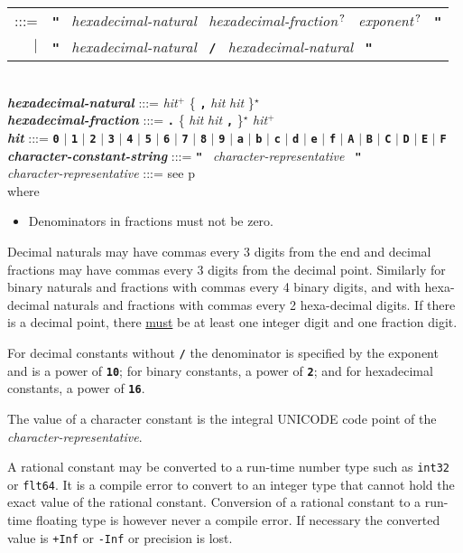 \documentclass[12pt]{article}
\newcommand{\TT}[1]{{\tt \bfseries #1}}
\newcommand{\STAR}{{\Large $^\star$}}
\newcommand{\PLUS}[1][]{{$^{+#1}$}}
\newcommand{\QMARK}{{$^{\,\mbox{\footnotesize ?}}$}}
\newcommand{\emkey}[1]{{\em \bfseries #1}}
\newcommand{\pagref}[1]{p\pageref{#1}}
\newenvironment{indpar}[1][0.3in]%
	{\begin{list}{}%
		     {\setlength{\itemsep}{0in}%
		      \setlength{\topsep}{0in}%
		      \setlength{\parsep}{1ex}%
		      \setlength{\labelwidth}{#1}%
		      \setlength{\leftmargin}{#1}%
		      \addtolength{\leftmargin}{\labelsep}}%
	 \item}%
	{\end{list}}
\begin{document}
\begin{indpar}
\begin{tabular}[t]{@{}rl}
    :::= & \TT{"}~ {\em hexadecimal-natural}~
                   {\em hexadecimal-fraction}\QMARK{}~
		   {\em exponent}\QMARK{}~ \TT{"} \\
     $|$ & \TT{"}~ {\em hexadecimal-natural}~ \TT{/}~
                   {\em hexadecimal-natural}~ \TT{"} \\
    \end{tabular}
\\[0.5ex]
\emkey{hexadecimal-natural}
    :::= {\em hit}\PLUS{}
           \{ \TT{,} {\em hit} {\em hit} \}\STAR{} \\
\emkey{hexadecimal-fraction} :::=
    \TT{.} \{ {\em hit} {\em hit} \TT{,} \}\STAR{}
    {\em hit}\PLUS{} \\
\emkey{hit} :::= \TT{0} $|$ \TT{1} $|$ \TT{2} $|$ \TT{3} $|$ \TT{4}
	     $|$ \TT{5} $|$ \TT{6} $|$ \TT{7} $|$ \TT{8} $|$ \TT{9}
	     $|$ \TT{a} $|$ \TT{b} $|$ \TT{c} $|$ \TT{d} $|$ \TT{e} $|$ \TT{f}
	     $|$ \TT{A} $|$ \TT{B} $|$ \TT{C} $|$ \TT{D} $|$ \TT{E} $|$ \TT{F}
\\[0.5ex]
\emkey{character-constant-string} :::=
	\TT{"}~ {\em character-representative}~ \TT{"}
\\[0.5ex]
{\em character-representative} :::= see \pagref{CHARACTER-REPRESENTATIVE}
\\[1ex]
where
\begin{itemize}
\item Denominators in fractions must not be zero.
\end{itemize}

\end{indpar}

Decimal naturals may have commas
every 3 digits from the end and decimal fractions may have
commas every 3 digits from the decimal point.
Similarly for binary naturals and fractions with commas every 4 binary
digits,
and with hexa-decimal naturals and fractions with commas every 2
hexa-decimal digits.
If there is a decimal point, there \underline{must}
be at least one integer digit and
one fraction digit.

For decimal constants without \TT{/} the denominator is specified by the
exponent and is a power of \TT{10}; for
binary constants, a power of \TT{2}; and for
hexadecimal constants, a power of \TT{16}.

The value of a character constant is the integral UNICODE code point of the
{\em character-representative}.

A rational constant may be converted to a run-time number
type such as {\tt int32} or {\tt flt64}.
It is a compile error to convert to an integer type that cannot
hold the exact value of the rational constant.
Conversion of a rational constant
to a run-time floating type is however
never a compile error.  If necessary the converted value is
{\tt +Inf} or {\tt -Inf} or precision is lost.
\end{document}
